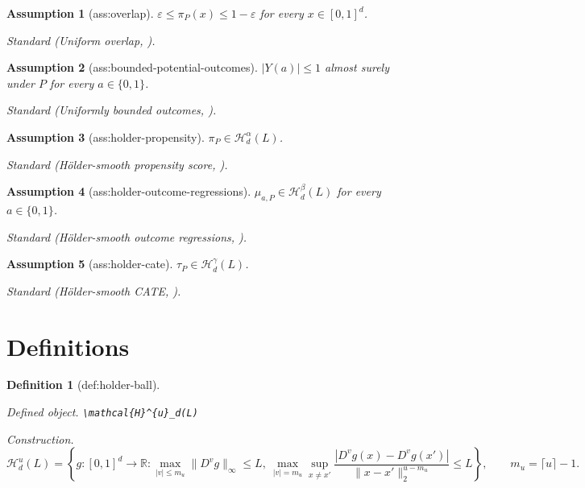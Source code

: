 \documentclass{article}
\newtheorem{assumption}{Assumption}
\newtheorem{definition}{Definition}
\begin{document}
\begin{assumption}[ass:overlap]\label{ass:overlap}
\(\varepsilon\le\pi_P(x)\le1-\varepsilon\) for every \(x\in[0,1]^d\).
\par\smallskip\noindent\emph{Standard} (Uniform overlap, \cite{KennedyBalakrishnanRobinsWasserman2024MinimaxCATE}).
\end{assumption}

\begin{assumption}[ass:bounded-potential-outcomes]\label{ass:bounded-potential-outcomes}
\(|Y(a)|\le1\) almost surely under \(P\) for every \(a\in\{0,1\}\).
\par\smallskip\noindent\emph{Standard} (Uniformly bounded outcomes, \cite{KennedyBalakrishnanRobinsWasserman2024MinimaxCATE}).
\end{assumption}

\begin{assumption}[ass:holder-propensity]\label{ass:holder-propensity}
\(\pi_P\in\mathcal{H}^{\alpha}_d(L)\).
\par\smallskip\noindent\emph{Standard} (H\"older-smooth propensity score, \cite{KennedyBalakrishnanRobinsWasserman2024MinimaxCATE}).
\end{assumption}

\begin{assumption}[ass:holder-outcome-regressions]\label{ass:holder-outcome-regressions}
\(\mu_{a,P}\in\mathcal{H}^{\beta}_d(L)\) for every \(a\in\{0,1\}\).
\par\smallskip\noindent\emph{Standard} (H\"older-smooth outcome regressions, \cite{KennedyBalakrishnanRobinsWasserman2024MinimaxCATE}).
\end{assumption}

\begin{assumption}[ass:holder-cate]\label{ass:holder-cate}
\(\tau_P\in\mathcal{H}^{\gamma}_d(L)\).
\par\smallskip\noindent\emph{Standard} (H\"older-smooth CATE, \cite{KennedyBalakrishnanRobinsWasserman2024MinimaxCATE}).
\end{assumption}

\section{Definitions}

\begin{definition}[def:holder-ball]\label{def:holder-ball}
\par\smallskip\noindent\emph{Defined object.} \texttt{\textbackslash{}\allowbreak{}mathcal\{H\}\allowbreak{}\textasciicircum{}\{u\}\allowbreak{}\_\allowbreak{}d(L)}
\par\smallskip\noindent\emph{Construction.} \[\mathcal{H}^{u}_d(L)=\left\{g:[0,1]^d\to\mathbb{R}:\max_{|v|\le m_u}\lVert D^v g\rVert_\infty\le L,\ \max_{|v|=m_u}\sup_{x\ne x'}\frac{|D^v g(x)-D^v g(x')|}{\lVert x-x'\rVert_2^{u-m_u}}\le L\right\},\qquad m_u=\lceil u\rceil-1.\]
\end{definition}
\end{document}
